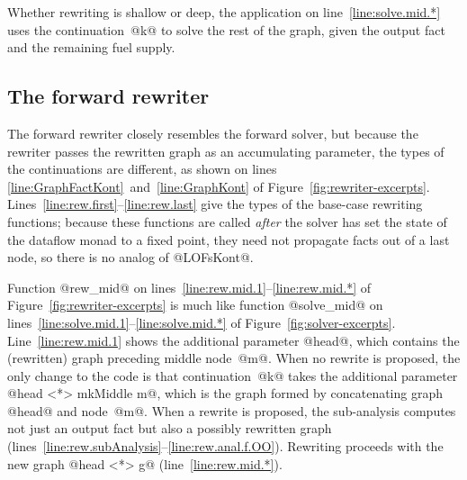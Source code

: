 \documentclass[blockstyle,preprint,natbib,nocopyrightspace]{sigplanconf}
\newcommand\lineref[1]{line~\ref{line:#1}}
\newcommand\linepairref[2]{lines \ref{line:#1}~and~\ref{line:#2}}
\newcommand\linerangeref[2]{\mbox{lines~\ref{line:#1}--\ref{line:#2}}}
\newcommand\Lineref[1]{Line~\ref{line:#1}}
\newcommand\Linerangeref[2]{\mbox{Lines~\ref{line:#1}--\ref{line:#2}}}
\newcommand\seclabel[1]{\label{sec:#1}}
\newcommand\figref[1]{Figure~\ref{fig:#1}}
\begin{document}
Whether rewriting is shallow or deep, the application on
\lineref{solve.mid.*} uses the continuation~@k@ to solve the rest of
the graph, given the output fact and the remaining fuel supply.






\subsection{The forward rewriter}

\seclabel{forward-rewriter}

The forward rewriter closely resembles the
forward solver, but because the rewriter passes the rewritten graph as
an accumulating parameter, the types of the continuations are
different, as shown on \linepairref{GraphFactKont}{GraphKont} of
\figref{rewriter-excerpts}. 
\Linerangeref{rew.first}{rew.last} give the types of the base-case
rewriting functions; because these functions are called \emph{after}
the solver has set the state of the dataflow monad to a fixed
point, they need not propagate facts out of a last node, so there is
no analog of @LOFsKont@.

Function @rew_mid@ on \linerangeref{rew.mid.1}{rew.mid.*} of
\figref{rewriter-excerpts} is much like function @solve_mid@ on 
\linerangeref{solve.mid.1}{solve.mid.*} of \figref{solver-excerpts}.
\Lineref{rew.mid.1} shows the additional parameter @head@, which
contains the (rewritten) graph preceding middle node~@m@.
When no rewrite is proposed, the only change to the code is that
continuation~@k@ takes the additional parameter
@head <*> mkMiddle m@,
which is the graph formed by concatenating graph @head@ and node~@m@. 
When a rewrite is proposed, the sub-analysis computes not just an
output fact but also a possibly rewritten graph
(\linerangeref{rew.subAnalysis}{rew.anal.f.OO}).
Rewriting proceeds with the new graph @head <*> g@
(\lineref{rew.mid.*}).
\end{document}
